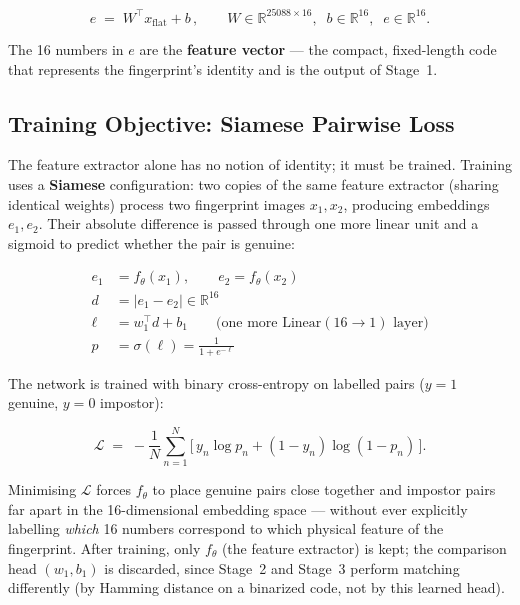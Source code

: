 \documentclass[11pt]{article}
\begin{document}
\begin{equation}
e \;=\; W^{\!\top} x_{\text{flat}} + b\,, \qquad
W \in \mathbb{R}^{25088\times16},\;\; b \in \mathbb{R}^{16},\;\; e \in \mathbb{R}^{16}.
\end{equation}

The 16 numbers in $e$ are the \textbf{feature vector} --- the compact, fixed-length code
that represents the fingerprint's identity and is the output of Stage~1.

\subsection{Training Objective: Siamese Pairwise Loss}

The feature extractor alone has no notion of identity; it must be trained. Training uses a
\textbf{Siamese} configuration: two copies of the same feature extractor (sharing identical
weights) process two fingerprint images $x_1, x_2$, producing embeddings $e_1, e_2$. Their
absolute difference is passed through one more linear unit and a sigmoid to predict whether
the pair is genuine:

\begin{align}
e_1 &= f_\theta(x_1), \qquad e_2 = f_\theta(x_2) \\
d   &= |e_1 - e_2| \in \mathbb{R}^{16} \\
\ell &= w_1^{\!\top} d + b_1 \qquad \text{(one more Linear}(16\to1)\text{ layer)} \\
p   &= \sigma(\ell) = \frac{1}{1+e^{-\ell}}
\end{align}

The network is trained with binary cross-entropy on labelled pairs ($y=1$ genuine, $y=0$
impostor):

\begin{equation}
\mathcal{L} \;=\; -\frac{1}{N}\sum_{n=1}^{N}
\Big[\, y_n \log p_n + (1-y_n)\log(1-p_n) \,\Big].
\end{equation}

Minimising $\mathcal{L}$ forces $f_\theta$ to place genuine pairs close together and
impostor pairs far apart in the 16-dimensional embedding space --- without ever explicitly
labelling \emph{which} 16 numbers correspond to which physical feature of the fingerprint.
After training, only $f_\theta$ (the feature extractor) is kept; the comparison head
$(w_1, b_1)$ is discarded, since Stage~2 and Stage~3 perform matching differently (by
Hamming distance on a binarized code, not by this learned head).
\end{document}
